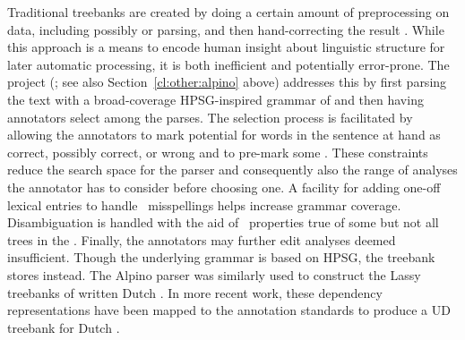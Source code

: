 \documentclass[output=paper,nonflat]{langsci/langscibook}
\begin{document}
Traditional treebanks are created by doing a certain amount of
preprocessing on data, including possibly  or  parsing, and
then hand-correcting the result \citep{Mar:San:Mar:93,Ban:Bon:Cai:13}.
While this approach is a means to encode human insight about
linguistic structure for later automatic processing, it is both
inefficient and potentially error-prone. The  project
(\citealt{vanderbeek2002alpino}; see also Section~\ref{cl:other:alpino} above) addresses this by first parsing the text
with a broad-coverage HPSG-inspired grammar of  and then having
annotators select among the parses. The selection process is
facilitated by allowing the annotators to mark potential  
for words in the sentence at hand as correct, possibly
correct, or wrong and to pre-mark some . These
constraints reduce the search space for the parser and consequently
also the range of analyses the annotator has to consider before
choosing one. A facility for adding one-off lexical entries to handle
\eg\ misspellings helps increase grammar coverage.  Disambiguation is
handled with the aid of \textit{} \ie\ properties true of
some but not all trees in the  \citep{Carter:97}. Finally,
the annotators may further edit analyses deemed insufficient. Though
the underlying grammar is based on HPSG, the treebank stores
 instead.  The Alpino parser was similarly
used to construct the Lassy treebanks of written Dutch
\citep{van:bou:van:13}.  In more recent work, these dependency
representations have been mapped to the 
annotation standards \citep{Niv:Mar:Gin:16} to produce a UD treebank
for Dutch \citep{Bou:Van:17}.
\end{document}
